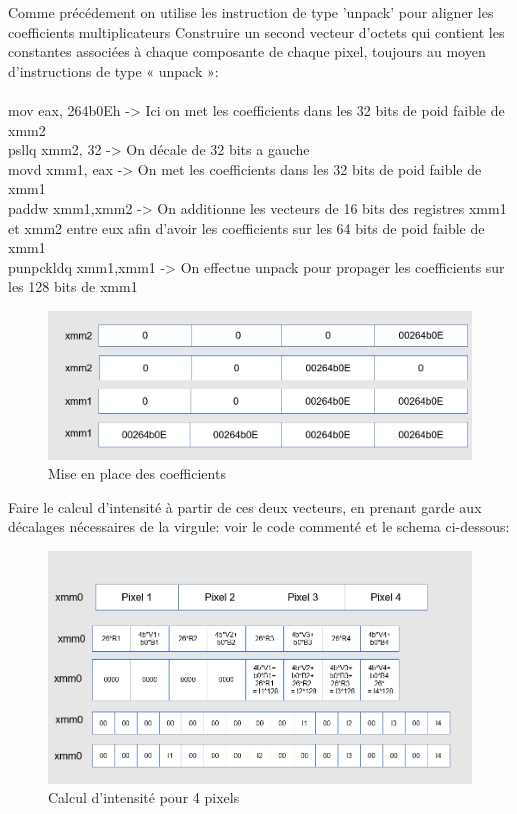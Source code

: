 \documentclass[11pt]{report}
\begin{document}
Comme précédement on utilise les instruction de type 'unpack' pour aligner les coefficients multiplicateurs
Construire un second vecteur d’octets qui contient les constantes associées à chaque
composante de chaque pixel, toujours au moyen d’instructions de type « unpack »:
\\
\\mov eax, 264b0Eh
-> Ici on met les coefficients dans les 32 bits de poid faible de xmm2
\\psllq xmm2, 32
-> On décale de 32 bits a gauche
\\movd xmm1, eax
-> On met les coefficients dans les 32 bits de poid faible de xmm1
\\paddw xmm1,xmm2
-> On additionne les vecteurs de 16 bits des registres xmm1 et xmm2 entre eux afin d'avoir les coefficients sur les 64 bits de poid faible de xmm1
\\punpckldq xmm1,xmm1
-> On effectue unpack pour propager les coefficients sur les 128 bits de xmm1
\newpage

\begin{figure}[h]
\includegraphics[width=13cm]{Capture1.PNG}
\caption{Mise en place des coefficients}
\end{figure}


Faire le calcul d’intensité à partir de ces deux vecteurs, en prenant garde aux décalages
nécessaires de la virgule: voir le code commenté et le schema ci-dessous:
\begin{figure}[h]
\includegraphics[width=13cm]{Capture2.PNG}
\caption{Calcul d'intensité pour 4 pixels}
\end{figure}
\end{document}
